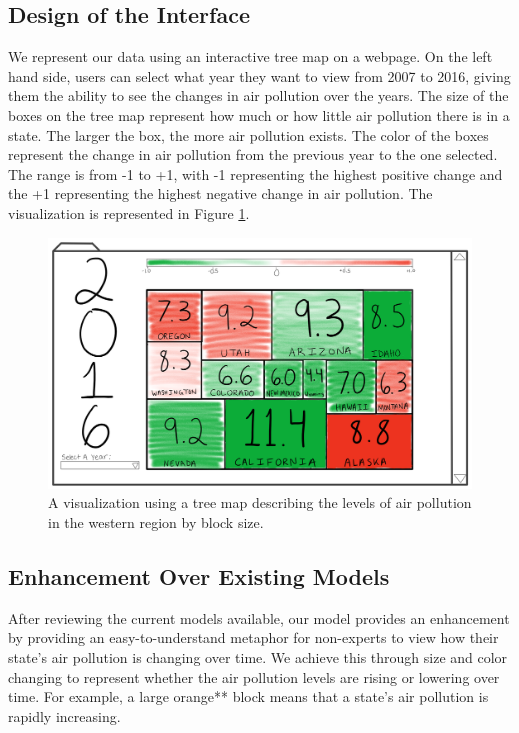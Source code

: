 \documentclass[journal]{vgtc}                %
\begin{document}
\subsection{Design of the Interface}

We represent our data using an interactive tree map on a webpage. On the left hand side, users can select what year 
they want to view from 2007 to 2016, giving them the ability to see the changes in air pollution over the years. The 
size of the boxes on the tree map represent how much or how little air pollution there is in a state. The larger the 
box, the more air pollution exists. The color of the boxes represent the change in air pollution from the previous 
year to the one selected. The range is from -1 to +1, with -1 representing the highest positive change and the +1 
representing the highest negative change in air pollution. The visualization is represented in Figure \ref{fig:Design}.

\begin{figure}
\centering
\includegraphics[width=\columnwidth]{HW1Design}
\caption{A visualization using a tree map describing the levels of air pollution in the western region by block size.}
\label{fig:Design}
\end{figure}

\subsection{Enhancement Over Existing Models}

After reviewing the current models available, our model provides an enhancement by providing an easy-to-understand
metaphor for non-experts to view how their state's air pollution is changing over time. We achieve this through size
and color changing to represent whether the air pollution levels are rising or lowering over time. For example, a large
orange** block means that a state's air pollution is rapidly increasing.
\end{document}
